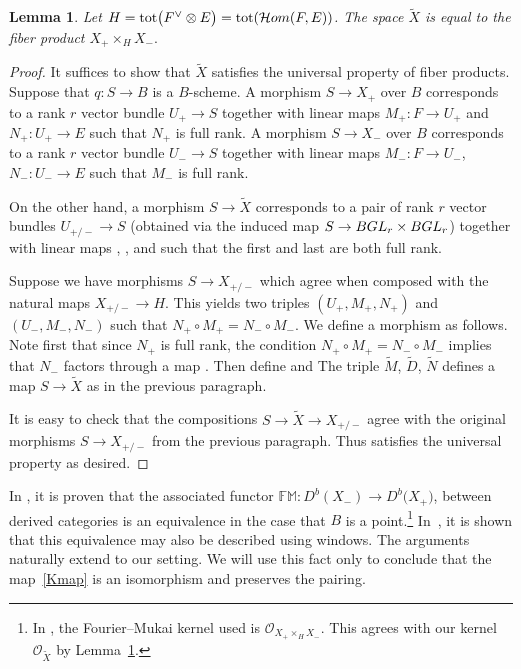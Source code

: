 \documentclass[11pt]{article}
\numberwithin{equation}{section}
\newtheorem{Lemma}[Theorem]{Lemma}
\numberwithin{equation}{section}
\newcommand{\cc}[1]{\mathcal{#1}} %
\DeclareMathOperator{\tot}{tot}
\begin{document}
\begin{Lemma}\label{l:FP} Let $H = \tot\bigl(F^\vee \otimes E\bigr) = \tot( \mathcal{H}{\rm om}(F, E) )$.
 The space $\tilde X$ is equal to the fiber product
 $X_+ \times_H X_-.$
\end{Lemma}
\begin{proof}
 It suffices to show that $\tilde X$ satisfies the universal property of fiber products. Suppose that $q\colon S \to B$ is a $B$-scheme. A morphism $S \to X_+$ over $B$ corresponds to a rank $r$ vector bundle $U_+ \to S$ together with linear maps $M_+\colon F \to U_+$ and $N_+\colon U_+ \to E$ such that $N_+$ is full rank. A morphism $S \to X_-$ over $B$ corresponds to a rank $r$ vector bundle $U_- \to S$ together with linear maps $M_-\colon F \to U_-$, $N_-\colon U_- \to E$ such that $M_-$ is full rank.

 On the other hand, a morphism $S \to \tilde X$ corresponds to a pair of rank $r$ vector bundles $U_{+/-} \to S$ (obtained via the induced map $S \to B{\rm GL}_r \times B{\rm GL}_r$) together with linear maps
 , , and  such that the first and last are both full rank.

 Suppose we have morphisms $S \to X_{+/-}$ which agree when composed with the natural maps $X_{+/-} \to H$.
 This yields two triples $(U_+, M_+, N_+)$ and $(U_-, M_-, N_-)$ such that $N_+ \circ M_+ = N_- \circ M_-$.
 We define a morphism  as follows.
 Note first that since $N_+$ is full rank, the condition $N_+ \circ M_+ = N_- \circ M_-$ implies that $N_-$ factors through a map . Then define  and  The triple $\tilde M$, $\tilde D$, $\tilde N$ defines a map $S \to \tilde X$ as in the previous paragraph.

It is easy to check that the compositions $S \to \tilde X \to X_{+/-}$ agree with the original morphisms $S \to X_{+/-}$ from the previous paragraph. Thus  satisfies the universal property as desired.
\end{proof}

In \cite[Theorem~D]{BLV}, it is proven that the
associated functor $\mathbb{FM}\colon D^b(X_-) \to D^b\bigl(X_+\bigr)$, between derived categories is an equivalence in the case that $B$ is a point.\footnote{In \cite{BLV}, the Fourier--Mukai kernel used is $\cc O_{X_+ \times_H X_-}$. This agrees with our kernel $\cc O_{\tilde X}$ by Lemma~\ref{l:FP}.} In~\cite{BCFMV}, it is shown that this equivalence may also be described using windows. The arguments naturally extend to our setting. We will use this fact only to conclude that the map~\eqref{Kmap} is an isomorphism and preserves the pairing.
\end{document}
